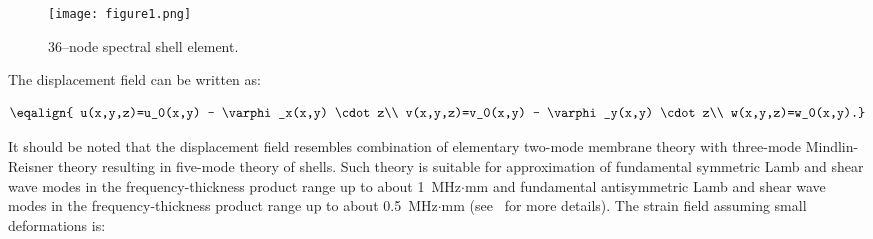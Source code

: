 \begin{figure} [h!]
	\centering
\texttt{[image: figure1.png]}	
\caption{36--node spectral shell element.}
	\label{fig:spectral_shell_element}
\end{figure}

The displacement field can be written as:

\begin{equation}
\eqalign{
u(x,y,z)=u_0(x,y) - \varphi_x(x,y) \cdot z\\
v(x,y,z)=v_0(x,y) - \varphi_y(x,y) \cdot z\\
w(x,y,z)=w_0(x,y).}
\label{eq:delam_platedispl}
\end{equation}

It should be noted that the displacement field resembles  combination of elementary two-mode membrane theory with three-mode Mindlin-Reisner theory resulting in  five-mode theory of shells. Such theory is suitable for  approximation of fundamental symmetric Lamb and shear wave modes in the frequency-thickness product range up to about 1~MHz\(\cdot\)mm and fundamental antisymmetric Lamb and shear wave modes in the frequency-thickness product range up to about 0.5~MHz\(\cdot\)mm (see~\cite{Ostachowicz2012} for more details).
The strain field assuming small deformations is:

